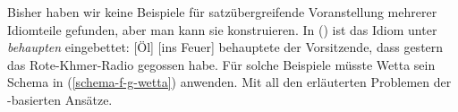 \begin{exe}
\begin{xlist}
\noindent
Bisher haben wir keine Beispiele für satzübergreifende Voranstellung mehrerer Idiomteile gefunden,
aber man kann sie konstruieren. In () ist das Idiom unter \emph{behaupten} eingebettet:
\ea 
{}[Öl] [ins Feuer] behauptete der Vorsitzende, dass gestern das Rote-Khmer-Radio gegossen habe.
\z
Für solche Beispiele müsste Wetta sein Schema in (\ref{schema-f-g-wetta}) anwenden. Mit all den
erläuterten Problemen der \slasch-basierten Ansätze.




\end{xlist}
\end{exe}
